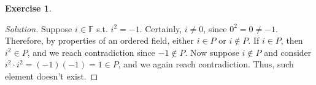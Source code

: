 \documentclass[letterpaper, 11pt, english]{article}
\theoremstyle{definition}
\theoremstyle{definition}
\newtheorem{problem}{Exercise}
\theoremstyle{definition}
\newenvironment{sol}{\begin{proof}[Solution]}{\end{proof}}
\theoremstyle{plain} %
\theoremstyle{plain} %
\theoremstyle{plain} %
\theoremstyle{plain} %
\theoremstyle{remark}
\begin{document}
\setcounter{problem}{12}
\begin{problem}
\begin{sol}
    Suppose $ i \in \mathbb{F} $ s.t. $ i^{2} = -1 $. 
    Certainly, $ i \ne 0 $, since $ 0^2 = 0 \ne -1 $. Therefore, by properties of
    an ordered field, either $ i \in P $ or $ i \not \in P $.
    If $ i \in P $, then $ i^{2} \in P $, and we reach contradiction since $ -1 \not \in P $.
    Now suppose $ i \not \in P $ and
    consider $ i^2 \cdot i^2 = (-1) (-1) = 1 \in P $, and we again reach contradiction.
    Thus, such element doesn't exist.
\end{sol}
\end{problem}



 
\end{document}

